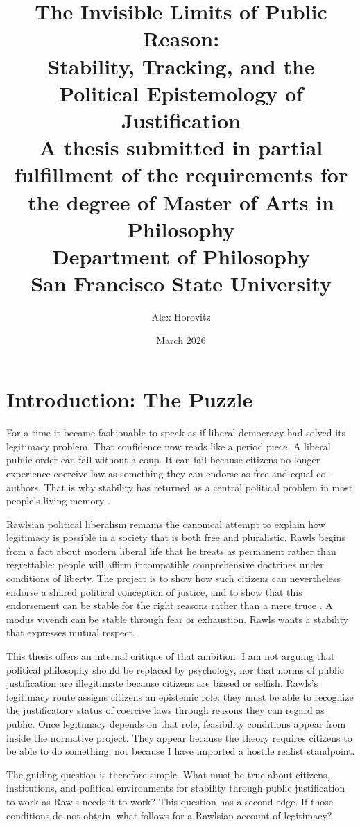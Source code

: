 \documentclass[12pt]{article}
\title{The Invisible Limits of Public Reason:\\
Stability, Tracking, and the Political Epistemology of Justification\\
\normalsize A thesis submitted in partial fulfillment of the requirements for the degree of Master of Arts in Philosophy\\
\normalsize Department of Philosophy\\
\normalsize San Francisco State University\\}
\author{Alex Horovitz}
\date{March 2026}
\begin{document}
\maketitle

\section{Introduction: The Puzzle}

For a time it became fashionable to speak as if liberal democracy had solved its legitimacy problem. That confidence now reads like a period piece. A liberal public order can fail without a coup. It can fail because citizens no longer experience coercive law as something they can endorse as free and equal co-authors. That is why stability has returned as a central political problem in most people's living memory \parencite[p.~1187]{Weithman2024Rescuing}.

Rawlsian political liberalism remains the canonical attempt to explain how legitimacy is possible in a society that is both free and pluralistic. Rawls begins from a fact about modern liberal life that he treats as permanent rather than regrettable: people will affirm incompatible comprehensive doctrines under conditions of liberty. The project is to show how such citizens can nevertheless endorse a shared political conception of justice, and to show that this endorsement can be stable for the right reasons rather than a mere truce \parencite[p.~1]{rawls1987overlapping}. A modus vivendi can be stable through fear or exhaustion. Rawls wants a stability that expresses mutual respect.

This thesis offers an internal critique of that ambition. I am not arguing that political philosophy should be replaced by psychology, nor that norms of public justification are illegitimate because citizens are biased or selfish. Rawls's legitimacy route assigns citizens an epistemic role: they must be able to recognize the justificatory status of coercive laws through reasons they can regard as public. Once legitimacy depends on that role, feasibility conditions appear from inside the normative project. They appear because the theory requires citizens to be able to do something, not because I have imported a hostile realist standpoint.

The guiding question is therefore simple. What must be true about citizens, institutions, and political environments for stability through public justification to work as Rawls needs it to work? This question has a second edge. If those conditions do not obtain, what follows for a Rawlsian account of legitimacy?
\end{document}
